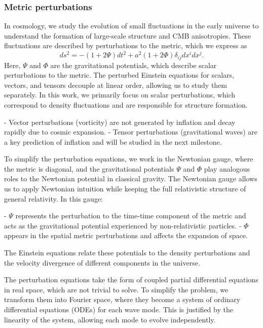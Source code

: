 \documentclass{aa}
\begin{document}


\subsubsection{Metric perturbations}
\color{Plum}
In cosmology, we study the evolution of small fluctuations in the early universe to understand the formation of large-scale structure and CMB anisotropies. These fluctuations are described by perturbations to the metric, which we express as  
\begin{equation}
ds^2 = - (1 + 2\Psi) dt^2 + a^2 (1 + 2\Phi) \delta_{ij} dx^i dx^j.
\end{equation}
Here, $\Psi$ and $\Phi$ are the gravitational potentials, which describe scalar perturbations to the metric. The perturbed Einstein equations for scalars, vectors, and tensors decouple at linear order, allowing us to study them separately. In this work, we primarily focus on scalar perturbations, which correspond to density fluctuations and are responsible for structure formation.  

- Vector perturbations (vorticity) are not generated by inflation and decay rapidly due to cosmic expansion.  
- Tensor perturbations (gravitational waves) are a key prediction of inflation and will be studied in the next milestone.  

To simplify the perturbation equations, we work in the Newtonian gauge, where the metric is diagonal, and the gravitational potentials $\Psi$ and $\Phi$ play analogous roles to the Newtonian potential in classical gravity. The Newtonian gauge allows us to apply Newtonian intuition while keeping the full relativistic structure of general relativity. In this gauge:  

- $\Psi$ represents the perturbation to the time-time component of the metric and acts as the gravitational potential experienced by non-relativistic particles.  
- $\Phi$ appears in the spatial metric perturbations and affects the expansion of space.  

The Einstein equations relate these potentials to the density perturbations and the velocity divergence of different components in the universe. 

The perturbation equations take the form of coupled partial differential equations in real space, which are not trivial to solve. To simplify the problem, we transform them into Fourier space, where they become a system of ordinary differential equations (ODEs) for each wave mode. This is justified by the linearity of the system, allowing each mode to evolve independently.  
\end{document}

